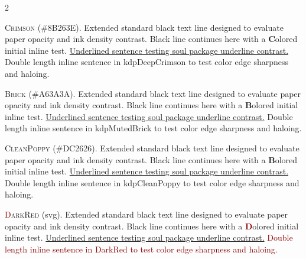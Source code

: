 
\thispagestyle{fancy}

\vspace{+.5em}


\renewcommand{\LettrineFontHook}{\fontspec{Aneirin}}

\begin{multicols}{2}


\lettrine[lines=2]{\textcolor{kdpDeepCrimson}{C}}{rimson} (\#8B263E). Extended standard black text line designed to evaluate paper opacity and ink density contrast. Black line continues here with a \textbf{\textcolor{kdpDeepCrimson}{C}}olored initial inline test. \ul{Underlined sentence testing soul package underline contrast.} \textcolor{kdpDeepCrimson}{Double length inline sentence in kdpDeepCrimson to test color edge sharpness and haloing.}


\lettrine[lines=2]{\textcolor{kdpMutedBrick}{B}}{rick} (\#A63A3A). Extended standard black text line designed to evaluate paper opacity and ink density contrast. Black line continues here with a \textbf{\textcolor{kdpMutedBrick}{B}}olored initial inline test. \ul{Underlined sentence testing soul package underline contrast.} \textcolor{kdpMutedBrick}{Double length inline sentence in kdpMutedBrick to test color edge sharpness and haloing.}


\lettrine[lines=2]{\textcolor{kdpCleanPoppy}{C}}{leanPoppy} (\#DC2626). Extended standard black text line designed to evaluate paper opacity and ink density contrast. Black line continues here with a \textbf{\textcolor{kdpCleanPoppy}{B}}olored initial inline test. \ul{Underlined sentence testing soul package underline contrast.} \textcolor{kdpCleanPoppy}{Double length inline sentence in kdpCleanPoppy to test color edge sharpness and haloing.}


\lettrine[lines=2]{\textcolor{DarkRed}{D}}{arkRed} (svg). Extended standard black text line designed to evaluate paper opacity and ink density contrast. Black line continues here with a \textbf{\textcolor{DarkRed}{D}}olored initial inline test. \ul{Underlined sentence testing soul package underline contrast.} \textcolor{DarkRed}{Double length inline sentence in DarkRed to test color edge sharpness and haloing.}


\end{multicols}

